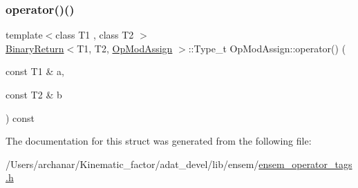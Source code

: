 \mbox{\label{structOpModAssign_ae4cd6a2eeb0dd164ae1f38821fd596d6}} 
\subsubsection{\texorpdfstring{operator()()}{operator()()}\hspace{0.1cm}{\footnotesize\ttfamily [2/2]}}
{\footnotesize\ttfamily template$<$class T1 , class T2 $>$ \\
\mbox{\hyperlink{structBinaryReturn}{Binary\+Return}}$<$T1, T2, \mbox{\hyperlink{structOpModAssign}{Op\+Mod\+Assign}} $>$\+::Type\+\_\+t Op\+Mod\+Assign\+::operator() (\begin{DoxyParamCaption}\item[{const T1 \&}]{a,  }\item[{const T2 \&}]{b }\end{DoxyParamCaption}) const\hspace{0.3cm}{\ttfamily [inline]}}



The documentation for this struct was generated from the following file\+:\begin{DoxyCompactItemize}
\item 
/\+Users/archanar/\+Kinematic\+\_\+factor/adat\+\_\+devel/lib/ensem/\mbox{\hyperlink{lib_2ensem_2ensem__operator__tags_8h}{ensem\+\_\+operator\+\_\+tags.\+h}}\end{DoxyCompactItemize}
